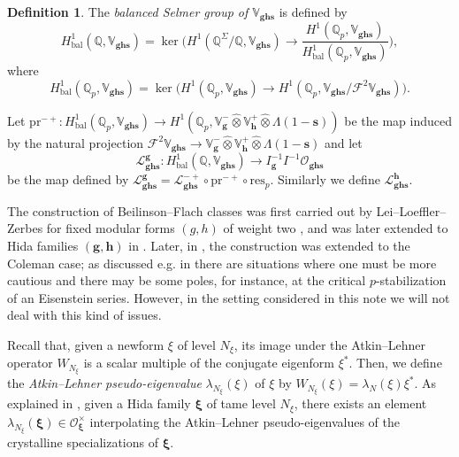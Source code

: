 \documentclass[a4paper,11pt]{amsart}
\theoremstyle{plain}
\theoremstyle{definition}
\newtheorem{definition}[theorem]{Definition}
\theoremstyle{remark}
\newcommand{\bb}{\mathbb}
\newcommand{\cl}{\mathcal}
\DeclareMathOperator{\bal}{bal}
\newcommand{\hg}{{\mathbf{g}}}
\newcommand{\hh}{{\mathbf h}}
\newcommand{\res}{\mathrm{res}}
\numberwithin{equation}{section}
\begin{document}
\begin{definition}\label{def:Sel1}
The \textit{balanced Selmer group of $\bb{V}_{\hg \hh \mathbf{s}}$} is defined by
\[
H^1_{\bal}(\bb{Q},\mathbb V_{\hg \hh \mathbf{s}}) = \ker \bigg(
H^1(\mathbb Q^\Sigma/\mathbb Q, \mathbb V_{\hg \hh \mathbf{s}}) \longrightarrow
\frac{H^1(\mathbb Q_p,\mathbb V_{\hg \hh \mathbf{s}})}{H^1_{\bal}(\bb{Q}_p,\mathbb V_{\hg \hh \mathbf{s}})}\bigg),
\]
where
\[
H^1_{\bal}(\bb{Q}_p,\mathbb V_{\hg \hh \mathbf{s}})=\ker \big(H^1(\mathbb Q_p, \mathbb V_{\hg \hh \mathbf{s}}) \longrightarrow H^1(\mathbb Q_p, \mathbb V_{\hg \hh \mathbf{s}}/\mathscr{F}^2\mathbb V_{\hg \hh \mathbf{s}}) \big).
\]
\end{definition}

Let $\mathrm{pr}^{-+}:H^1_{\bal}(\bb{Q}_p,\bb{V}_{\hg\hh \mathbf{s}})\rightarrow H^1(\bb{Q}_p,\bb{V}_{\hg}^-\hat{\otimes}\bb{V}_\hh^+\hat{\otimes}\Lambda(1-\mathbf{s}))$ be the map induced by the natural projection $\mathscr{F}^2\bb{V}_{\hg\hh\mathbf{s}}\rightarrow \bb{V}_\hg^-\hat{\otimes}\bb{V}_\hh^+\hat{\otimes}\Lambda(1-\mathbf{s})$ and let
\[
\mathcal{L}_{\hg\hh\mathbf{s}}^{\hg}:H^1_{\bal}(\bb{Q},\bb{V}_{\hg\hh\mathbf{s}})\longrightarrow I_{\hg}^{-1}I^{-1}\cl{O}_{\hg\hh\mathbf{s}}
\]
be the map defined by $\mathcal{L}_{\hg\hh\mathbf{s}}^\hg=\mathcal{L}_{\hg\hh\mathbf{s}}^{-+}\circ \mathrm{pr}^{-+}\circ \res_p$. Similarly we define $\mathcal{L}_{\hg\hh\mathbf{s}}^\hh$.

The construction of Beilinson--Flach classes was first carried out by Lei--Loeffler--Zerbes for fixed modular forms $(g,h)$ of weight two \cite{LLZ0}, and was later extended to Hida families $(\hg,\hh)$ in \cite{KLZ0}. Later, in \cite{LZ-coleman}, the construction was extended to the Coleman case; as discussed e.g. in \cite{LR1} there are situations where one must be more cautious and there may be some poles, for instance, at the critical $p$-stabilization of an Eisenstein series. However, in the setting considered in this note we will not deal with this kind of issues. 

Recall that, given a newform $\xi$ of level $N_{\xi}$, its image under the Atkin--Lehner operator $W_{N_\xi}$ is a scalar multiple of the conjugate eigenform $\xi^*$. Then, we define the {\it Atkin--Lehner pseudo-eigenvalue} $\lambda_{N_\xi}(\xi)$ of $\xi$ by $W_{N_\xi}(\xi) = \lambda_N(\xi)\xi^*$. As explained in \cite[\S10]{KLZ}, given a Hida family $\bm{\xi}$ of tame level $N_\xi$, there exists an element $\lambda_{N_\xi}(\bm{\xi})\in\cl{O}_{\bm{\xi}}^\times$ interpolating the Atkin--Lehner pseudo-eigenvalues of the crystalline specializations of $\bm{\xi}$.
\end{document}
